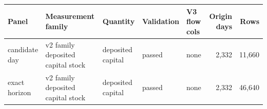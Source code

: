 \begin{tabular}{lllllrr}
\toprule
Panel & Measurement family & Quantity & Validation & V3 flow cols & Origin days & Rows \\
\midrule
candidate day & v2 family deposited capital stock & deposited capital & passed & none & 2,332 & 11,660 \\
exact horizon & v2 family deposited capital stock & deposited capital & passed & none & 2,332 & 46,640 \\
\bottomrule
\end{tabular}
